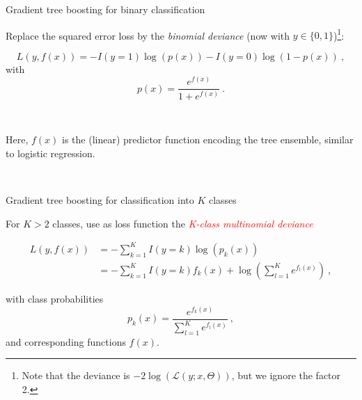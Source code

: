 \documentclass[
  10pt,
  ignorenonframetext,
]{beamer}
\begin{document}
\begin{frame}
\begin{block}{Gradient tree boosting for binary classification}
\protect\hypertarget{gradient-tree-boosting-for-binary-classification}{}
\(~\)

Replace the squared error loss by the \emph{binomial deviance} (now with
\(y\in \{0,1\}\))\footnote{Note that the deviance is $-2\log(\mathcal{L}(y;x,\Theta))$, but we ignore the factor 2.}:

\[L(y,f(x)) = -I(y=1) \log(p(x)) - I(y=0) \log(1-p(x)) \ , \] with
\[p(x) = \frac{e^{f(x)}}{1+e^{f(x)}} \ .\]

\(~\)

Here, \(f(x)\) is the (linear) predictor function encoding the tree
ensemble, similar to logistic regression.

\(~\)
\end{block}
\end{frame}

\begin{frame}
\begin{block}{Gradient tree boosting for classification into \(K\)
classes}
\protect\hypertarget{gradient-tree-boosting-for-classification-into-k-classes}{}
\(~\)

For \(K>2\) classes, use as loss function the
\emph{\textcolor{red}{K-class multinomial deviance}}

\begin{align}
L(y,f(x)) &= -\sum_{k=1}^K I(y = k) \log (p_k(x)) \\ 
 & = -\sum_{k=1}^K I(y = k) f_k(x) + \log(\sum_{l=1}^K e^{f_l(x)}) \ ,
 \end{align}

with class probabilities
\[p_k(x) = \frac{e^{f_k(x)}}{\sum_{l=1}^K e^{f_l(x)}} \ , \] and
corresponding functions \(f(x)\).
\end{block}
\end{frame}
\end{document}
